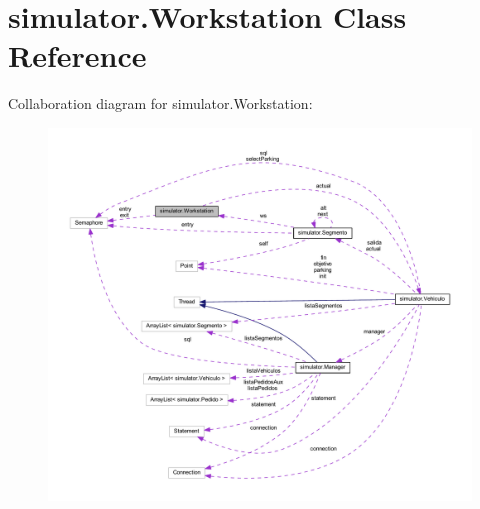 \hypertarget{classsimulator_1_1_workstation}{}\section{simulator.\+Workstation Class Reference}
\label{classsimulator_1_1_workstation}


Collaboration diagram for simulator.\+Workstation\+:\nopagebreak
\begin{figure}[H]
\begin{center}
\leavevmode
\includegraphics[width=350pt]{classsimulator_1_1_workstation__coll__graph}
\end{center}
\end{figure}
